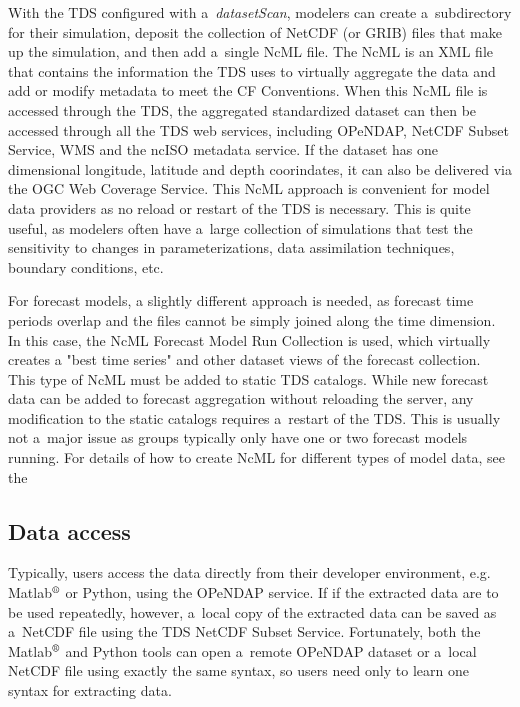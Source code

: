 \documentclass[osd, online, hvmath]{copernicus}
\begin{document}
With the TDS configured with a~\textit{datasetScan}, modelers can
create a~subdirectory for their simulation, deposit the collection of
NetCDF (or GRIB) files that make up the simulation, and then add
a~single NcML file. The NcML is an XML file that contains the
information the TDS uses to virtually aggregate the data and add or modify
metadata to meet the CF Conventions. When this NcML file is accessed
through the TDS, the aggregated standardized dataset can then be
accessed through all the TDS web services, including OPeNDAP, NetCDF
Subset Service, WMS and the ncISO metadata service.  If the dataset has one dimensional longitude, latitude and depth coorindates, it can also be delivered via the OGC Web Coverage Service. This NcML approach is convenient for model data providers as no reload or
restart of the TDS is necessary.  This is quite useful, as modelers often have a~large collection of simulations that test
the sensitivity to changes in parameterizations, data
assimilation techniques, boundary conditions, etc.

For forecast models, a slightly different approach is needed, as forecast time periods
overlap and the files cannot be simply joined along the time dimension.  In this case, the NcML Forecast Model Run Collection is used, which virtually creates a "best time series"  and other dataset views of the forecast collection.  This type of NcML must
be added to static TDS catalogs. While new forecast data can be added to
forecast aggregation without reloading the server, any modification to
the static catalogs requires a~restart of the TDS. This is usually not
a~major issue as groups typically only have one or two forecast models
running.   For details of how to create NcML for different types of model data, see the 

\subsection{Data access}

Typically, users access the data directly from their developer
environment, e.g.  Matlab$^{\text{\textregistered}}$ or Python, using
the OPeNDAP service. If if the extracted data are to be used
repeatedly, however, a~local copy of the extracted data can be saved as
a~NetCDF file using the TDS NetCDF Subset Service. Fortunately, both
the Matlab$^{\text{\textregistered}}$ and Python tools can open
a~remote OPeNDAP dataset or a~local NetCDF file using exactly the same
syntax, so users need only 
to learn one syntax for extracting data.
\end{document}
